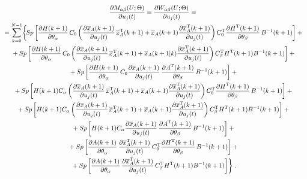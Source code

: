   \begin{multline}
  \fr{\partial M_{\alpha\beta}(U;\Theta)}{\partial u_j(t)}=\fr{\partial
W_{\alpha\beta}(U;\Theta)}{\partial u_j(t)}={}\\
  {}=\sum\limits_{k=0}^{N-1}\!\left \{\!Sp\left[\fr{\partial
H(k+1)}{\partial\theta_\alpha}\,C_0\left(\fr{\partial\overline{x}_A(k+1)}{\partial
u_j(t)}\,\overline{x}_A^{\mathrm{T}}(k+1)+\overline{x}_A(k+1)\fr{\partial\overline{x}_A^{\mathrm{T}}(k
+1)}{\partial u_j(t)}\right) C_0^{\mathrm{T}}\fr{\partial H^{\mathrm{T}}(k+1)}{\partial\theta_\beta}\,B^{-
1}(k+1)\right]+{}\right.\\
  {}+Sp\left[\fr{\partial
H(k+1)}{\partial\theta_\alpha}\,C_0\left(\fr{\partial\overline{x}_A(k+1)}{\partial
u_j(t)}\,\overline{x}_A^{\mathrm{T}}(k+1)+\overline{x}_A(k+1\vert
k)\fr{\partial\overline{x}_A^{\mathrm{T}}(k+1)}{\partial u_j(t)}\right)C_\beta^{\mathrm{T}} H^{\mathrm{T}}(k+1)B^{-
1}(k+1)\right]+{}\\
  {}+Sp\left[\fr{\partial
H(k+1)}{\partial\theta_\alpha}\,C_0\fr{\partial\overline{x}_A(k+1)}{\partial
u_j(t)}\,\fr{\partial A^{\mathrm{T}}(k+1)}{\partial\theta_\beta}\,B^{-1}(k+1)\right]+{}\\
  {}+ Sp\left[ H(k+1) C_\alpha\left( \fr{\partial\overline{x}_A(k+1)}{\partial
u_j(t)}\,\overline{x}_A^{\mathrm{T}}(k+1)+\overline{x}_A(k+1)\fr{\partial
\overline{x}^{\mathrm{T}}_A(k+1)}{\partial u_j(t)}\right) C_0^{\mathrm{T}}\fr{\partial
H^{\mathrm{T}}(k+1)}{\partial\theta_\beta}\,B^{-1}(k+1)\right]+{}\\
  {}+ Sp\left[ H(k+1)C_\alpha \left( \fr{\partial \overline{x}_A(k+1)}{\partial
u_j(t)}\,\overline{x}_A^{\mathrm{T}}(k+1)+\overline{x}_A(k+1)\fr{\partial\overline{x}_A^{\mathrm{T}}(k
+1)}{\partial u_j(t)}\right)C_\beta^{\mathrm{T}} H^{\mathrm{T}}(k+1) B^{-1}(k+1)\right]+{}\\
  {}+ Sp\left[ H(k+1) C_\alpha \fr{\partial\overline{x}_A(k+1)}{\partial
u_j(t)}\,\fr{\partial A^{\mathrm{T}}(k+1)}{\partial\theta_\beta}\,B^{-1}(k+1)\right]+{}\\
  {}+ Sp\left[ \fr{\partial
A(k+1)}{\partial\theta_\alpha}\,\fr{\partial\overline{x}_A^{\mathrm{T}}(k+1)}{\partial
u_j(t)}\,C_0^{\mathrm{T}}\fr{\partial H^{\mathrm{T}}(k+1)}{\partial\theta_\beta}\,B^{-1}(k+1)\right]+{}\\
  \left.{}+Sp\left[ \fr{\partial
A(k+1)}{\partial\theta_\alpha}\,\fr{\partial\overline{x}_A^{\mathrm{T}}(k+1)}{\partial
u_j(t)}\,C_\beta^{\mathrm{T}} H^{\mathrm{T}}(k+1)B^{-1}(k+1)\right]\right\}\,.
  \label{e19-c}
  \end{multline}
  

